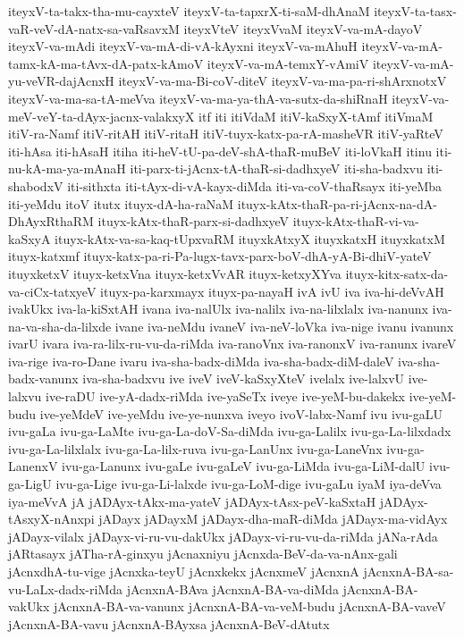 {iteyxV-ta-takx-tha-mu-cayxteV
iteyxV-ta-tapxrX-ti-saM-dhAnaM
iteyxV-ta-tasx-vaR-veV-dA-natx-sa-vaRsavxM
iteyxVteV
iteyxVvaM
iteyxV-va-mA-dayoV
iteyxV-va-mAdi
iteyxV-va-mA-di-vA-kAyxni
iteyxV-va-mAhuH
iteyxV-va-mA-tamx-kA-ma-tAvx-dA-patx-kAmoV
iteyxV-va-mA-temxY-vAmiV
iteyxV-va-mA-yu-veVR-dajAcnxH
iteyxV-va-ma-Bi-coV-diteV
iteyxV-va-ma-pa-ri-shArxnotxV
iteyxV-va-ma-sa-tA-meVva
iteyxV-va-ma-ya-thA-va-sutx-da-shiRnaH
iteyxV-va-meV-veY-ta-dAyx-jacnx-valakxyX
itf
iti
itiVdaM
itiV-kaSxyX-tAmf
itiVmaM
itiV-ra-Namf
itiV-ritAH
itiV-ritaH
itiV-tuyx-katx-pa-rA-masheVR
itiV-yaRteV
iti-hAsa
iti-hAsaH
itiha
iti-heV-tU-pa-deV-shA-thaR-muBeV
iti-loVkaH
itinu
iti-nu-kA-ma-ya-mAnaH
iti-parx-ti-jAcnx-tA-thaR-si-dadhxyeV
iti-sha-badxvu
iti-shabodxV
iti-sithxta
iti-tAyx-di-vA-kayx-diMda
iti-va-coV-thaRsayx
iti-yeMba
iti-yeMdu
itoV
itutx
ituyx-dA-ha-raNaM
ituyx-kAtx-thaR-pa-ri-jAcnx-na-dA-DhAyxRthaRM
ituyx-kAtx-thaR-parx-si-dadhxyeV
ituyx-kAtx-thaR-vi-va-kaSxyA
ituyx-kAtx-va-sa-kaq-tUpxvaRM
ituyxkAtxyX
ituyxkatxH
ituyxkatxM
ituyx-katxmf
ituyx-katx-pa-ri-Pa-lugx-tavx-parx-boV-dhA-yA-Bi-dhiV-yateV
ituyxketxV
ituyx-ketxVna
ituyx-ketxVvAR
ituyx-ketxyXYva
ituyx-kitx-satx-da-va-ciCx-tatxyeV
ituyx-pa-karxmayx
ituyx-pa-nayaH
ivA
ivU
iva
iva-hi-deVvAH
ivakUkx
iva-la-kiSxtAH
ivana
iva-nalUlx
iva-nalilx
iva-na-lilxlalx
iva-nanunx
iva-na-va-sha-da-lilxde
ivane
iva-neMdu
ivaneV
iva-neV-loVka
iva-nige
ivanu
ivanunx
ivarU
ivara
iva-ra-lilx-ru-vu-da-riMda
iva-ranoVnx
iva-ranonxV
iva-ranunx
ivareV
iva-rige
iva-ro-Dane
ivaru
iva-sha-badx-diMda
iva-sha-badx-diM-daleV
iva-sha-badx-vanunx
iva-sha-badxvu
ive
iveV
iveV-kaSxyXteV
ivelalx
ive-lalxvU
ive-lalxvu
ive-raDU
ive-yA-dadx-riMda
ive-yaSeTx
iveye
ive-yeM-bu-dakekx
ive-yeM-budu
ive-yeMdeV
ive-yeMdu
ive-ye-nunxva
iveyo
ivoV-labx-Namf
ivu
ivu-gaLU
ivu-gaLa
ivu-ga-LaMte
ivu-ga-La-doV-Sa-diMda
ivu-ga-Lalilx
ivu-ga-La-lilxdadx
ivu-ga-La-lilxlalx
ivu-ga-La-lilx-ruva
ivu-ga-LanUnx
ivu-ga-LaneVnx
ivu-ga-LanenxV
ivu-ga-Lanunx
ivu-gaLe
ivu-gaLeV
ivu-ga-LiMda
ivu-ga-LiM-dalU
ivu-ga-LigU
ivu-ga-Lige
ivu-ga-Li-lalxde
ivu-ga-LoM-dige
ivu-gaLu
iyaM
iya-deVva
iya-meVvA
jA
jADAyx-tAkx-ma-yateV
jADAyx-tAsx-peV-kaSxtaH
jADAyx-tAsxyX-nAnxpi
jADayx
jADayxM
jADayx-dha-maR-diMda
jADayx-ma-vidAyx
jADayx-vilalx
jADayx-vi-ru-vu-dakUkx
jADayx-vi-ru-vu-da-riMda
jANa-rAda
jARtasayx
jATha-rA-ginxyu
jAcnaxniyu
jAcnxda-BeV-da-va-nAnx-gali
jAcnxdhA-tu-vige
jAcnxka-teyU
jAcnxkekx
jAcnxmeV
jAcnxnA
jAcnxnA-BA-sa-vu-LaLx-dadx-riMda
jAcnxnA-BAva
jAcnxnA-BA-va-diMda
jAcnxnA-BA-vakUkx
jAcnxnA-BA-va-vanunx
jAcnxnA-BA-va-veM-budu
jAcnxnA-BA-vaveV
jAcnxnA-BA-vavu
jAcnxnA-BAyxsa
jAcnxnA-BeV-dAtutx
}
